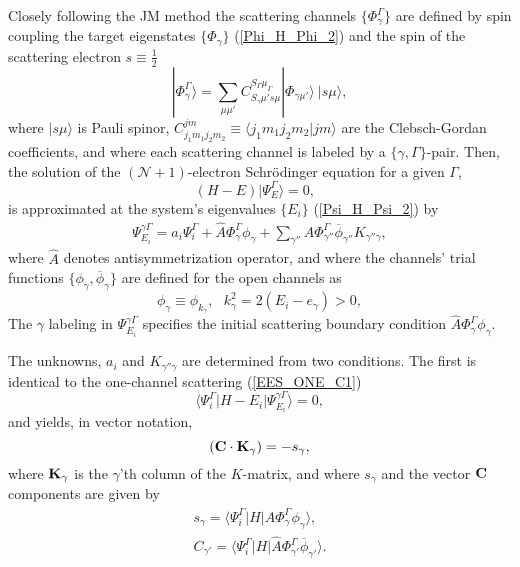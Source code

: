 \documentclass[aip
, pra
, showpacs
, aps
, twocolumn
, groupedaddress
, floatfix
]{revtex4}
\newcommand{\beq}{\begin{equation}}
\newcommand{\eeq}{\end{equation}}
\newcommand{\barr}{\begin{array}}
\newcommand{\earr}{\end{array}}
\begin{document}
Closely following the JM method \cite{BR76p1491, KFB11} the scattering channels $\{\Phi_\gamma^\Gamma\}$ are defined by spin coupling the target eigenstates
$\{\Phi_\gamma\}$ (\ref{Phi_H_Phi_2})
and the spin of the scattering electron
$s\equiv \frac{1}{2}$
\beq
| \Phi_{\gamma}^{\Gamma} \rangle = \sum_{\mu \mu'}
C_{S_\gamma \mu' s \mu}^{S_\Gamma \mu_\Gamma}
|\Phi_{\gamma \mu'} \rangle \ |s \mu  \rangle,
\label{chi_phi_Gamma} \eeq
where $|s \mu \rangle$ is Pauli spinor,
$C_{j_1m_1j_2m_2}^{jm} \equiv \langle j_1m_1 j_2 m_2| jm\rangle$ are the Clebsch-Gordan coefficients,
and where each scattering channel is labeled by a $\{\gamma, \Gamma\}$-pair.
Then, the solution of the $(\mathcal{N}+1)$-electron Schr\"odinger equation for a given $\Gamma$,
\beq
(H-E) | \Psi^\Gamma_E \rangle =0,  \ \ \  \label{H_E_Psi_E_2}
\eeq
is approximated at the system's eigenvalues $\{E_i\}$ (\ref{Psi_H_Psi_2}) by
\beq \barr{l}
 \Psi_{E_i}^{\gamma \Gamma}  =  a_i \Psi_i^{\Gamma}
 + \hat{A} \Phi^\Gamma_{\gamma}  \phi_{\gamma}
+ \sum_{\gamma''}  \hat{A} \Phi^\Gamma_{\gamma''}   \overline{\phi}_{\gamma''}  K_{\gamma'' \gamma},
\earr \label{Psi_} \eeq
where $\hat{A}$ denotes antisymmetrization operator, 
and where the channels' trial functions $\{ \phi_\gamma, \overline{\phi}_\gamma \}$ are defined for the open channels as
\beq
\phi_{\gamma}\equiv \phi_{k_\gamma}, \ \ \   k_{\gamma}^2 = 2(E_i - e_\gamma) > 0,
\eeq
The $\gamma$ labeling in $\Psi_{E_i}^{\gamma \Gamma}$ specifies the initial scattering boundary condition $\hat{A} \Phi^\Gamma_{\gamma}  \phi_{\gamma}$.


The unknowns, $a_i$ and $K_{\gamma'' \gamma}$ are determined from two conditions. The first is identical to the one-channel scattering (\ref{EES_ONE_C1})
\beq 
\langle\Psi_i^\Gamma|H-E_i|\Psi_{E_i}^{\gamma \Gamma}\rangle=0,
\label{EES_MC_C1} \eeq  %
and yields, in vector notation, 
\beq
({\bf C} \cdot {\bf K}_\gamma) = -s_\gamma, \label{CK_s}
\eeq
where ${\bf K}_\gamma$ is the $\gamma$'th column of the $K$-matrix, and where $s_\gamma$ and the vector ${\bf C}$ components are given by
\beq \barr{l}
s_\gamma = \langle \Psi_i^\Gamma |H| \hat{A} \Phi^\Gamma_{\gamma} \phi_{\gamma} \rangle,\\
C_{\gamma'} =  \langle \Psi_i^\Gamma |H | \hat{A} \Phi^\Gamma_{\gamma'} \overline{\phi}_{\gamma'} \rangle.
\earr \label{Psi_} \eeq
\end{document}
